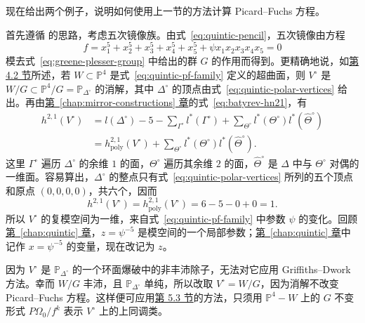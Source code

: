现在给出两个例子，说明如何使用上一节的方法计算 Picard--Fuchs 方程。

\begin{example}\label{ex:quintic-pf-method}
首先遵循  的思路，考虑五次镜像族。由式~\eqref{eq:quintic-pencil}，五次镜像由方程
\begin{equation}\label{eq:quintic-pf-family}
f=x_1^5+x_2^5+x_3^5+x_4^5+x_5^5+\psi x_1x_2x_3x_4x_5=0
\end{equation}
模去式~\eqref{eq:greene-plesser-group} 中给出的群 $G$ 的作用而得到。更精确地说，如\hyperref[sec:quintic-revisited]{第 4.2 节}所述，若 $W\subset\mathbb P^4$ 是式~\eqref{eq:quintic-pf-family} 定义的超曲面，则 $V^\circ$ 是
$W/G\subset\mathbb P^4/G=\mathbb P_{\Delta^\circ}$ 的消解，其中 $\Delta^\circ$ 的顶点由式~\eqref{eq:quintic-polar-vertices} 给出。再由\hyperref[chap:mirror-constructions]{第~\ref*{chap:mirror-constructions} 章}的式~\eqref{eq:batyrev-hn21}，有
\begin{equation}\label{eq:example-polynomial-hodge}
\begin{split}
h^{2,1}(V^\circ)
&=l(\Delta^\circ)-5-\sum_{\Gamma^\circ}l^*(\Gamma^\circ)
+\sum_{\Theta^\circ}l^*(\Theta^\circ)l^*(\widehat\Theta^\circ)\\
&=h_{\mathrm{poly}}^{2,1}(V^\circ)
+\sum_{\Theta^\circ}l^*(\Theta^\circ)l^*(\widehat\Theta^\circ).
\end{split}
\end{equation}
这里 $\Gamma^\circ$ 遍历 $\Delta^\circ$ 的余维 $1$ 的面，$\Theta^\circ$ 遍历其余维 $2$ 的面，$\widehat\Theta^\circ$ 是 $\Delta$ 中与 $\Theta^\circ$ 对偶的一维面。容易算出，$\Delta^\circ$ 的整点只有式~\eqref{eq:quintic-polar-vertices} 所列的五个顶点和原点 $(0,0,0,0)$，共六个，因而
\[
h^{2,1}(V^\circ)=h_{\mathrm{poly}}^{2,1}(V^\circ)=6-5-0+0=1.
\]
所以 $V^\circ$ 的复模空间为一维，来自式~\eqref{eq:quintic-pf-family} 中参数 $\psi$ 的变化。回顾\hyperref[chap:quintic]{第~\ref*{chap:quintic} 章}，$z=\psi^{-5}$ 是模空间的一个局部参数；\hyperref[chap:quintic]{第~\ref*{chap:quintic} 章}中记作 $x=\psi^{-5}$ 的变量，现在改记为 $z$。

因为 $V^\circ$ 是 $\mathbb P_{\Delta^\circ}$ 的一个环面爆破中的非丰沛除子，无法对它应用 Griffiths--Dwork 方法。幸而 $W/G$ 丰沛，且 $\mathbb P_{\Delta^\circ}$ 单纯，所以改取 $V^\circ=W/G$，因为消解不改变 Picard--Fuchs 方程。这样便可应用\hyperref[sec:griffiths-dwork]{第 5.3 节}的方法，只须用 $\mathbb P^4-W$ 上的 $G$ 不变形式 $P\Omega_0/f^k$ 表示 $V^\circ$ 上的上同调类。


\end{example}
